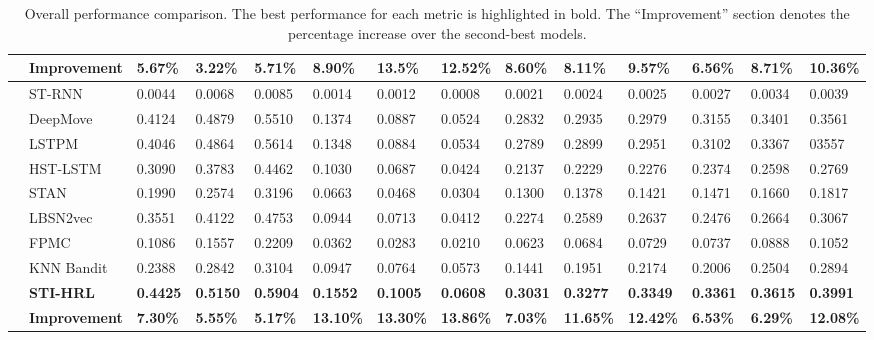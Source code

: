 \documentclass[letterpaper]{article} %
\begin{document}
\begin{table}[htbp]
\begin{tabular}{c|C{1.8cm}|p{0.8cm}p{0.8cm}p{0.8cm}|p{0.8cm}p{0.8cm}p{0.8cm}|p{0.8cm}p{0.8cm}p{0.8cm}|p{0.8cm}p{0.8cm}p{0.8cm}}
\midrule
&  \textbf{Improvement} &
\textbf{5.67\%}& \textbf{3.22\%}& \textbf{5.71\%}&
\textbf{8.90\%}& \textbf{13.5\%}& \textbf{12.52\%}&
\textbf{8.60\%}& \textbf{8.11\%}& \textbf{9.57\%}&
\textbf{6.56\%}& \textbf{8.71\%}& \textbf{10.36\%}\\

\midrule
{}

&ST-RNN & 0.0044 & 0.0068 & 0.0085 & 0.0014 & 0.0012 & 0.0008 & 0.0021 & 0.0024& 0.0025 & 0.0027 & 0.0034 & 0.0039\\
& DeepMove& 0.4124 & 0.4879 & 0.5510 & 0.1374 & 0.0887 & 0.0524 & 0.2832 & 0.2935& 0.2979 & 0.3155 & 0.3401& 0.3561 \\
&  LSTPM & 0.4046 & 0.4864 & 0.5614 & 0.1348 & 0.0884 & 0.0534 & 0.2789 & 0.2899& 0.2951 & 0.3102 & 0.3367 & 03557\\
& HST-LSTM & 0.3090 & 0.3783 & 0.4462 & 0.1030 & 0.0687 & 0.0424 & 0.2137 & 0.2229& 0.2276 & 0.2374 & 0.2598& 0.2769\\
&  STAN& 0.1990 & 0.2574 & 0.3196 & 0.0663 & 0.0468 & 0.0304 & 0.1300 & 0.1378& 0.1421 & 0.1471 & 0.1660& 0.1817 \\
& LBSN2vec & 0.3551 & 0.4122 & 0.4753  & 0.0944  &  0.0713 &  0.0412 & 0.2274  & 0.2589 & 0.2637 &  0.2476 & 0.2664 & 0.3067\\
& FPMC & 0.1086 & 0.1557 & 0.2209 & 0.0362 & 0.0283 & 0.0210 & 0.0623 & 0.0684& 0.0729& 0.0737 & 0.0888 & 0.1052\\
& KNN Bandit & 0.2388 & 0.2842 & 0.3104  & 0.0947  &  0.0764 &  0.0573 & 0.1441  & 0.1951 &  0.2174 & 0.2006  & 0.2504 & 0.2894  \\
& \textbf{STI-HRL}
& \textbf{0.4425} &\textbf{0.5150}  & \textbf{0.5904}  & \textbf{0.1552}   & \textbf{0.1005}  &  \textbf{0.0608} & \textbf{0.3031}  & \textbf{0.3277} & \textbf{0.3349}  &  \textbf{0.3361 }& \textbf{0.3615} & \textbf{0.3991} \\

\midrule
&  \textbf{Improvement} &
\textbf{7.30\%}& \textbf{5.55\%}& \textbf{5.17\%}&
\textbf{13.10\%}& \textbf{13.30\%}& \textbf{13.86\%}&
\textbf{7.03\%}& \textbf{11.65\%}& \textbf{12.42\%}& \textbf{6.53\%}& \textbf{6.29\%}& \textbf{12.08\%}\\

\bottomrule
\end{tabular}
\caption{Overall performance comparison. The best performance for each metric is highlighted in bold. The ``Improvement'' section denotes the percentage increase over the second-best models.}
\label{Experment_Table}
\end{table}
\end{document}
